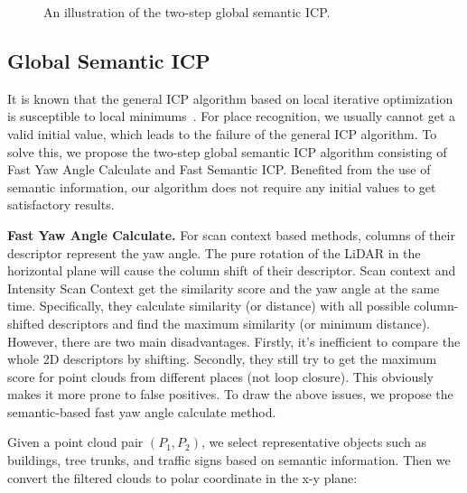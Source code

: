 \documentclass[letterpaper, 10 pt, conference]{ieeeconf}  %
\begin{document}
\begin{figure}[t]
    \centering
    \caption{An illustration of the two-step global semantic ICP.}
    \label{pic:yaw_icp}
 \end{figure}

\subsection{Global Semantic ICP}
It is known that the general ICP algorithm based on local iterative optimization is susceptible to local minimums~\cite{goicp}. For place recognition, we usually cannot get a valid initial value, which leads to the failure of the general ICP algorithm. To solve this, we propose the two-step global semantic ICP algorithm consisting of Fast Yaw Angle Calculate and Fast Semantic ICP. Benefited from the use of semantic information, our algorithm does not require any initial values to get satisfactory results.

\textbf{Fast Yaw Angle Calculate.}\label{ssc:yaw}
For scan context based methods, columns of their descriptor represent the yaw angle. The pure rotation of the LiDAR in the horizontal plane will cause the column shift of their descriptor. Scan context and Intensity Scan Context get the similarity score and the yaw angle at the same time. Specifically, they calculate similarity (or distance) with all possible column-shifted descriptors and find the maximum similarity (or minimum distance). However, there are two main disadvantages. Firstly, it's inefficient to compare the whole 2D descriptors by shifting. Secondly, they still try to get the maximum score for point clouds from different places (not loop closure). This obviously makes it more prone to false positives. To draw the above issues, we propose the semantic-based fast yaw angle calculate method.

Given a point cloud pair \( (P_1,P_2)\), we select representative objects such as buildings, tree trunks, and traffic signs based on semantic information. Then we convert the filtered clouds to polar coordinate in  the x-y plane:
\end{document}
